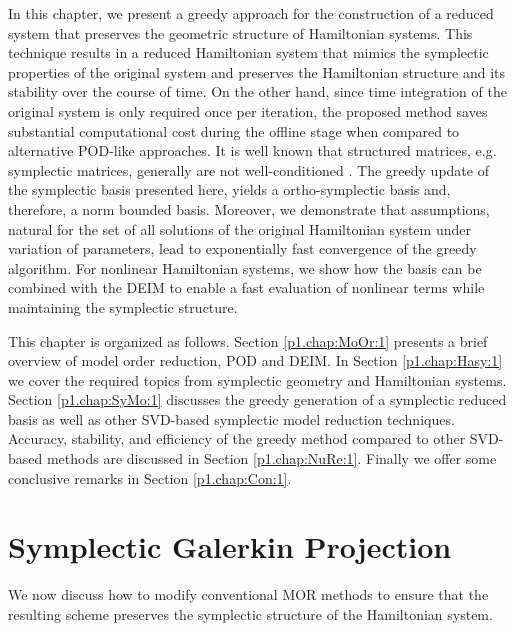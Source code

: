 In this chapter, we present a greedy approach for the construction of a reduced system that preserves the geometric structure of Hamiltonian systems. This technique results in a reduced Hamiltonian system that mimics the symplectic properties of the original system and preserves the Hamiltonian structure and its stability over the course of time. On the other hand, since time integration of the original system is only required once per iteration, the proposed method saves substantial computational cost during the offline stage when compared to alternative POD-like approaches. It is well known that structured matrices, e.g. symplectic matrices, generally are not well-conditioned \cite{doi:10.1137/050628519}. The greedy update of the symplectic basis presented here, yields a ortho-symplectic basis and, therefore, a norm bounded basis. Moreover, we demonstrate that assumptions, natural for the set of all solutions of the original Hamiltonian system under variation of parameters, lead to exponentially fast convergence of the greedy algorithm. For nonlinear Hamiltonian systems, we show how the basis can be combined with the DEIM \cite{doi:10.1137/090766498,barrault2004empirical} to enable a fast evaluation of nonlinear terms while maintaining the symplectic structure.

This chapter is organized as follows. Section \ref{p1.chap:MoOr:1} presents a brief overview of model order reduction, POD and DEIM. In Section \ref{p1.chap:Hasy:1} we cover the required topics from symplectic geometry and Hamiltonian systems. Section \ref{p1.chap:SyMo:1} discusses the greedy generation of a symplectic reduced basis as well as other SVD-based symplectic model reduction techniques. Accuracy, stability, and efficiency of the greedy method compared to other SVD-based methods are discussed in Section \ref{p1.chap:NuRe:1}. Finally we offer some conclusive remarks in Section \ref{p1.chap:Con:1}.


\section{Symplectic Galerkin Projection} \label{chap:SyMo:1}
We now discuss how to modify conventional MOR methods to ensure that the resulting scheme preserves the symplectic structure of the Hamiltonian system. 

